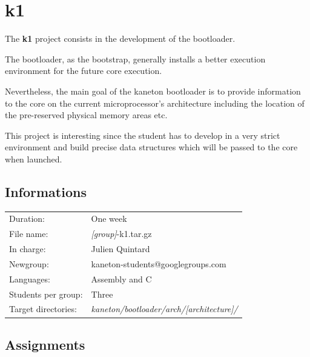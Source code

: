 
%
%

\chapter{k1}

The \textbf{k1} project consists in the development of the bootloader.

The bootloader, as the bootstrap, generally installs a better execution
environment for the future core execution.

Nevertheless, the main goal of the kaneton bootloader is to provide
information to the core on the current microprocessor's architecture
including the location of the pre-reserved physical memory areas etc.

This project is interesting since the student has to develop in a very
strict environment and build precise data structures which will be passed
to the core when launched.

\newpage

%
%

\section{Informations}

\begin{tabular}{p{7cm}l}
Duration: & One week \\
File name: & \textit{[group]}-k1.tar.gz \\
In charge: & Julien Quintard \\
Newgroup: & kaneton-students@googlegroups.com \\
Languages: & Assembly and C \\
Students per group: & Three \\
Target directories: & \textit{kaneton/bootloader/arch/[architecture]/} \\
\end{tabular}

%
%

\section{Assignments}


